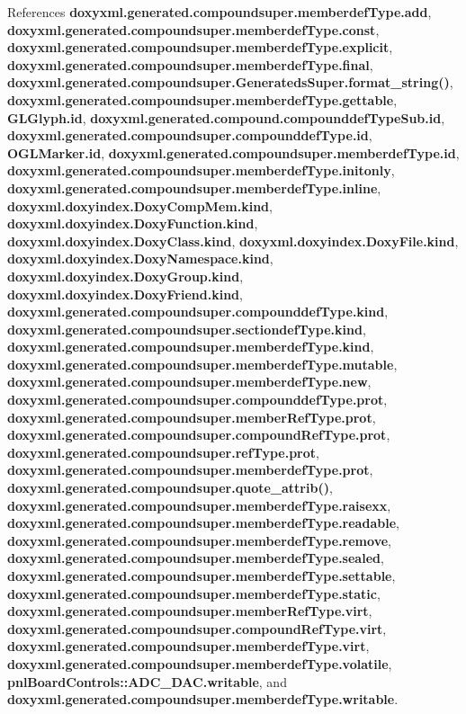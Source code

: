 References {\bf doxyxml.\+generated.\+compoundsuper.\+memberdef\+Type.\+add}, {\bf doxyxml.\+generated.\+compoundsuper.\+memberdef\+Type.\+const}, {\bf doxyxml.\+generated.\+compoundsuper.\+memberdef\+Type.\+explicit}, {\bf doxyxml.\+generated.\+compoundsuper.\+memberdef\+Type.\+final}, {\bf doxyxml.\+generated.\+compoundsuper.\+Generateds\+Super.\+format\+\_\+string()}, {\bf doxyxml.\+generated.\+compoundsuper.\+memberdef\+Type.\+gettable}, {\bf G\+L\+Glyph.\+id}, {\bf doxyxml.\+generated.\+compound.\+compounddef\+Type\+Sub.\+id}, {\bf doxyxml.\+generated.\+compoundsuper.\+compounddef\+Type.\+id}, {\bf O\+G\+L\+Marker.\+id}, {\bf doxyxml.\+generated.\+compoundsuper.\+memberdef\+Type.\+id}, {\bf doxyxml.\+generated.\+compoundsuper.\+memberdef\+Type.\+initonly}, {\bf doxyxml.\+generated.\+compoundsuper.\+memberdef\+Type.\+inline}, {\bf doxyxml.\+doxyindex.\+Doxy\+Comp\+Mem.\+kind}, {\bf doxyxml.\+doxyindex.\+Doxy\+Function.\+kind}, {\bf doxyxml.\+doxyindex.\+Doxy\+Class.\+kind}, {\bf doxyxml.\+doxyindex.\+Doxy\+File.\+kind}, {\bf doxyxml.\+doxyindex.\+Doxy\+Namespace.\+kind}, {\bf doxyxml.\+doxyindex.\+Doxy\+Group.\+kind}, {\bf doxyxml.\+doxyindex.\+Doxy\+Friend.\+kind}, {\bf doxyxml.\+generated.\+compoundsuper.\+compounddef\+Type.\+kind}, {\bf doxyxml.\+generated.\+compoundsuper.\+sectiondef\+Type.\+kind}, {\bf doxyxml.\+generated.\+compoundsuper.\+memberdef\+Type.\+kind}, {\bf doxyxml.\+generated.\+compoundsuper.\+memberdef\+Type.\+mutable}, {\bf doxyxml.\+generated.\+compoundsuper.\+memberdef\+Type.\+new}, {\bf doxyxml.\+generated.\+compoundsuper.\+compounddef\+Type.\+prot}, {\bf doxyxml.\+generated.\+compoundsuper.\+member\+Ref\+Type.\+prot}, {\bf doxyxml.\+generated.\+compoundsuper.\+compound\+Ref\+Type.\+prot}, {\bf doxyxml.\+generated.\+compoundsuper.\+ref\+Type.\+prot}, {\bf doxyxml.\+generated.\+compoundsuper.\+memberdef\+Type.\+prot}, {\bf doxyxml.\+generated.\+compoundsuper.\+quote\+\_\+attrib()}, {\bf doxyxml.\+generated.\+compoundsuper.\+memberdef\+Type.\+raisexx}, {\bf doxyxml.\+generated.\+compoundsuper.\+memberdef\+Type.\+readable}, {\bf doxyxml.\+generated.\+compoundsuper.\+memberdef\+Type.\+remove}, {\bf doxyxml.\+generated.\+compoundsuper.\+memberdef\+Type.\+sealed}, {\bf doxyxml.\+generated.\+compoundsuper.\+memberdef\+Type.\+settable}, {\bf doxyxml.\+generated.\+compoundsuper.\+memberdef\+Type.\+static}, {\bf doxyxml.\+generated.\+compoundsuper.\+member\+Ref\+Type.\+virt}, {\bf doxyxml.\+generated.\+compoundsuper.\+compound\+Ref\+Type.\+virt}, {\bf doxyxml.\+generated.\+compoundsuper.\+memberdef\+Type.\+virt}, {\bf doxyxml.\+generated.\+compoundsuper.\+memberdef\+Type.\+volatile}, {\bf pnl\+Board\+Controls\+::\+A\+D\+C\+\_\+\+D\+A\+C.\+writable}, and {\bf doxyxml.\+generated.\+compoundsuper.\+memberdef\+Type.\+writable}.



